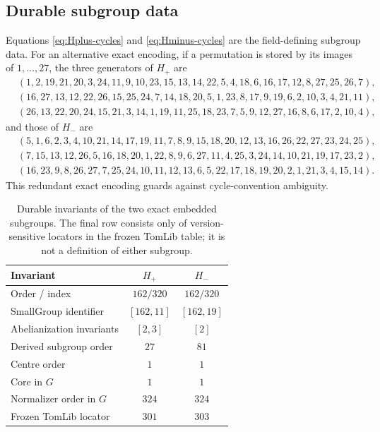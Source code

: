 \subsection{Durable subgroup data}

Equations \eqref{eq:Hplus-cycles} and \eqref{eq:Hminus-cycles} are the
field-defining subgroup data.  For an alternative exact encoding, if a
permutation is stored by its images of $1,\ldots,27$, the three generators
of $H_+$ are
\begin{align*}
&(1,2,19,21,20,3,24,11,9,10,23,15,13,14,22,5,4,18,6,16,17,12,8,27,25,26,7),\\
&(16,27,13,12,22,26,15,25,24,7,14,18,20,5,1,23,8,17,9,19,6,2,10,3,4,21,11),\\
&(26,13,22,20,24,15,21,3,14,1,19,11,25,18,23,7,5,9,12,27,16,8,6,17,2,10,4),
\end{align*}
and those of $H_-$ are
\begin{align*}
&(5,1,6,2,3,4,10,21,14,17,19,11,7,8,9,15,18,20,12,13,16,26,22,27,23,24,25),\\
&(7,15,13,12,26,5,16,18,20,1,22,8,9,6,27,11,4,25,3,24,14,10,21,19,17,23,2),\\
&(16,23,9,8,26,27,7,25,24,10,11,12,13,6,5,22,17,18,19,20,2,1,21,3,4,15,14).
\end{align*}
This redundant exact encoding guards against cycle-convention ambiguity.

\FloatBarrier
\begin{table}[t]
\centering
\caption{Durable invariants of the two exact embedded subgroups.  The final
row consists only of version-sensitive locators in the frozen TomLib table;
it is not a definition of either subgroup.}
\label{tab:subgroup-invariants}
\begin{tabular}{@{}lcc@{}}
\toprule
Invariant & $H_+$ & $H_-$\\
\midrule
Order / index & $162/320$ & $162/320$\\
SmallGroup identifier & $[162,11]$ & $[162,19]$\\
Abelianization invariants & $[2,3]$ & $[2]$\\
Derived subgroup order & $27$ & $81$\\
Centre order & $1$ & $1$\\
Core in $G$ & $1$ & $1$\\
Normalizer order in $G$ & $324$ & $324$\\
Frozen TomLib locator & $301$ & $303$\\
\bottomrule
\end{tabular}
\end{table}
\FloatBarrier


